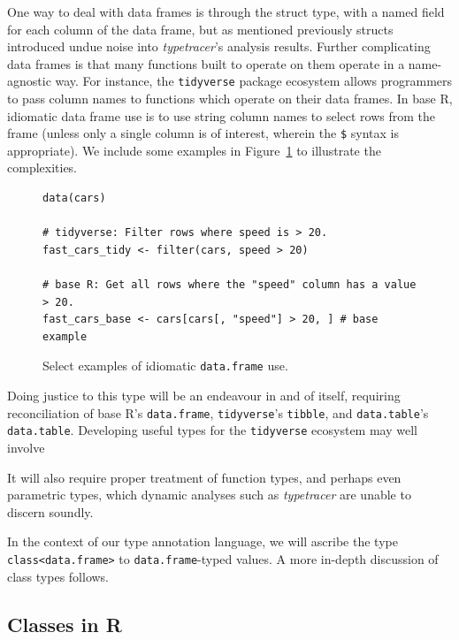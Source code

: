 \documentclass[acmsmall,review,anonymous]{acmart}\settopmatter{printfolios=true,printccs=false,printacmref=false}
\newcommand{\code}[1]{{\lstinline[style=Rin]!#1!}\xspace}
\newcommand{\typetracer}{\emph{typetracer}\xspace} %
\begin{document}
One way to deal with data frames is through the struct type, with a named field for each column of the data frame, but as mentioned previously structs introduced undue noise into \typetracer's analysis results. 
Further complicating data frames is that many functions built to operate on them operate in a name-agnostic way.
For instance, the \code{tidyverse} package ecosystem allows programmers to pass column names to functions which operate on their data frames.
In base R, idiomatic data frame use is to use string column names to select rows from the frame (unless only a single column is of interest, wherein the \code{$} syntax is appropriate). 
We include some examples in Figure~\ref{fig:data-frames-bad} to illustrate the complexities.

\begin{figure}[htbp]
\begin{center}

\begin{lstlisting}
data(cars)

# tidyverse: Filter rows where speed is > 20. 
fast_cars_tidy <- filter(cars, speed > 20)

# base R: Get all rows where the "speed" column has a value > 20.
fast_cars_base <- cars[cars[, "speed"] > 20, ] # base example

\end{lstlisting}

\caption{Select examples of idiomatic \code{data.frame} use.}
\label{fig:data-frames-bad}
\end{center}
\end{figure}

Doing justice to this type will be an endeavour in and of itself, requiring reconciliation of base R's \code{data.frame}, \code{tidyverse}'s \code{tibble}, and \code{data.table}'s \code{data.table}.
Developing useful types for the \code{tidyverse} ecosystem may well involve 

It will also require proper treatment of function types, and perhaps even parametric types, which dynamic analyses such as \typetracer are unable to discern soundly.

In the context of our type annotation language, we will ascribe the type \code{class<data.frame>} to \code{data.frame}-typed values.
A more in-depth discussion of class types follows.

%
%
%
%
\subsection{Classes in R}
\label{subsec:classes}
\end{document}
